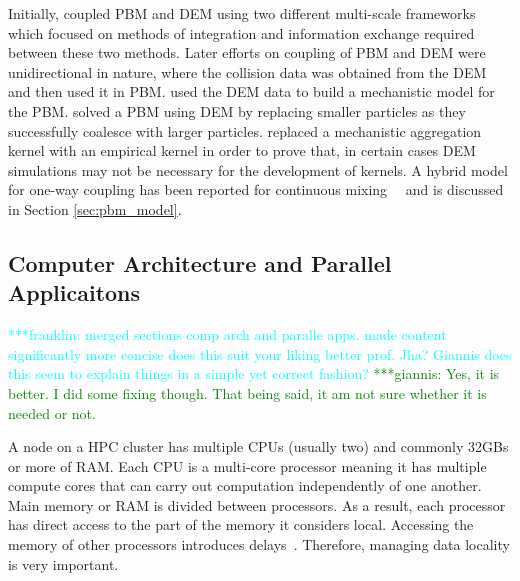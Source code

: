 \documentclass[preprint,11pt,authoryear]{elsarticle}
\newcommand{\jhanote}[1]{ {\textcolor{red} { ***shantenu: #1 }}}
\newcommand{\csnote}[1]{ {\textcolor{blue} { ***chaitanya: #1 }}}
\newcommand{\gpnote}[1]{{\textcolor{green} {***giannis: #1}}}
\newcommand{\fbnote}[1]{{\textcolor{cyan} { ***franklin: #1 }}}
\newcommand{\jhanote}[1]{}
\newcommand{\csnote}[1]{}
\newcommand{\gpnote}[1]{}
\begin{document}
Initially, \cite{ingram2004} coupled PBM and DEM using two different multi-scale frameworks which 
focused on methods of integration and information exchange required between these two methods. 
Later efforts on coupling of PBM and DEM were unidirectional in nature, where the collision 
data was obtained from the DEM and then used it in PBM. \cite{gantt2006} used the DEM data 
to build a mechanistic model for the PBM. \cite{Goldschmidt2003} solved a PBM using DEM by 
replacing smaller particles as they successfully coalesce with larger particles. 
\cite{Reinhold2012} replaced a mechanistic aggregation kernel with an empirical kernel 
in order to prove that, in certain cases DEM simulations may not be necessary for the 
development of kernels. A hybrid model for one-way coupling has been reported for continuous 
mixing~\citep{sen2013}~\citep{sen2013b} and is discussed in Section \ref{sec:pbm_model}.
%
% 

\subsection{Computer Architecture and Parallel Applicaitons}

\fbnote{merged sections comp arch and paralle apps. made content significantly more concise
does this suit your liking better prof. Jha? Giannis does this seem to explain things in a simple
yet correct fashion?}\gpnote{Yes, it is better. I did some fixing though. That being said, it am
not sure whether it is needed or not.}

A node on a HPC cluster has multiple CPUs (usually two) and commonly 32GBs or more of RAM. 
Each CPU is a multi-core processor meaning it has multiple compute cores that can carry 
out computation independently of one another. Main memory or RAM is divided between processors.
As a result, each processor has direct access to the part of the memory it considers local.
Accessing the memory of other processors introduces delays~\cite{Jin2011}. 
Therefore, managing data locality is very important.
 
\end{document}
